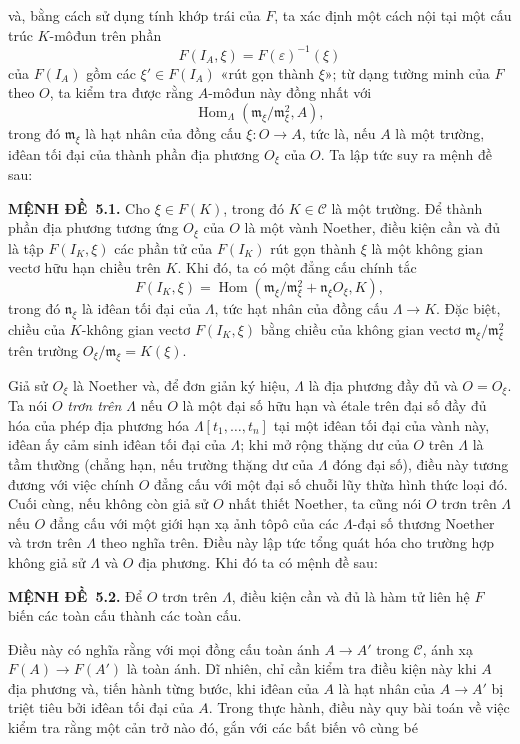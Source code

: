 \documentclass[11pt,twoside,openany]{book}
\numberwithin{equation}{section}
\newcommand{\src}[1]{%
  \phantomsection\hypertarget{src:\fgasourceid:#1}{}%
  \marginpar{\raggedleft\footnotesize\sffamily #1}%
}
\newcommand{\fgasourceid}{unset}
\newcommand{\result}[2]{\par\medskip\noindent\textbf{#1\if\relax\detokenize{#2}\relax\else\ #2\fi.}\quad}
\begin{document}
\src{376}
và, bằng cách sử dụng tính khớp trái của $F$, ta xác định một cách nội tại
một cấu trúc $K$-môđun trên phần
\[
  F(I_A,\xi)=F(\varepsilon)^{-1}(\xi)
\]
của $F(I_A)$ gồm các $\xi'\in F(I_A)$ «rút gọn thành $\xi$»; từ dạng tường
minh của $F$ theo $O$, ta kiểm tra được rằng $A$-môđun này đồng nhất với
\[
  \operatorname{Hom}_{\Lambda}(\mathfrak m_\xi/\mathfrak m_\xi^2,A),
\]
trong đó $\mathfrak m_\xi$ là hạt nhân của đồng cấu
$\xi:O\longrightarrow A$, tức là, nếu $A$ là một trường, iđêan tối đại của
thành phần địa phương $O_\xi$ của $O$. Ta lập tức suy ra mệnh đề sau:

\result{MỆNH ĐỀ}{5.1} Cho $\xi\in F(K)$, trong đó $K\in\mathcal C$ là một
trường. Để thành phần địa phương tương ứng $O_\xi$ của $O$ là một vành
Noether, điều kiện cần và đủ là tập $F(I_K,\xi)$ các phần tử của $F(I_K)$ rút
gọn thành $\xi$ là một không gian vectơ hữu hạn chiều trên $K$. Khi đó, ta có
một đẳng cấu chính tắc
\[
  F(I_K,\xi)=
  \operatorname{Hom}\!\left(
    \mathfrak m_\xi/\mathfrak m_\xi^2+\mathfrak n_\xi O_\xi,K
  \right),
\]
trong đó $\mathfrak n_\xi$ là iđêan tối đại của $\Lambda$, tức hạt nhân của
đồng cấu $\Lambda\longrightarrow K$.
Đặc biệt, chiều của $K$-không gian vectơ $F(I_K,\xi)$ bằng chiều của không
gian vectơ $\mathfrak m_\xi/\mathfrak m_\xi^2$ trên trường
$O_\xi/\mathfrak m_\xi=K(\xi)$.

Giả sử $O_\xi$ là Noether và, để đơn giản ký hiệu, $\Lambda$ là địa phương
đầy đủ và $O=O_\xi$. Ta nói $O$ \emph{trơn trên $\Lambda$} nếu $O$ là một
đại số hữu hạn và étale trên đại số đầy đủ hóa của phép địa phương hóa
$\Lambda[t_1,\ldots,t_n]$ tại một iđêan tối đại của vành này, iđêan ấy cảm
sinh iđêan tối đại của $\Lambda$; khi mở rộng thặng dư của $O$ trên
$\Lambda$ là tầm thường (chẳng hạn, nếu trường thặng dư của $\Lambda$ đóng
đại số), điều này tương đương với việc chính $O$ đẳng cấu với một đại số
chuỗi lũy thừa hình thức loại đó.
Cuối cùng, nếu không còn giả sử $O$ nhất thiết Noether, ta cũng nói $O$ trơn
trên $\Lambda$ nếu $O$ đẳng cấu với một giới hạn xạ ảnh tôpô của các
$\Lambda$-đại số thương Noether và trơn trên $\Lambda$ theo nghĩa trên. Điều
này lập tức tổng quát hóa cho trường hợp không giả sử $\Lambda$ và $O$ địa
phương. Khi đó ta có mệnh đề sau:

\result{MỆNH ĐỀ}{5.2} Để $O$ trơn trên $\Lambda$, điều kiện cần và đủ là hàm
tử liên hệ $F$ biến các toàn cấu thành các toàn cấu.

Điều này có nghĩa rằng với mọi đồng cấu toàn ánh
$A\longrightarrow A'$ trong $\mathcal C$, ánh xạ
$F(A)\longrightarrow F(A')$ là toàn ánh. Dĩ nhiên, chỉ cần kiểm tra điều kiện
này khi $A$ địa phương và, tiến hành từng bước, khi iđêan của $A$ là hạt nhân
của $A\longrightarrow A'$ bị triệt tiêu bởi iđêan tối đại của $A$. Trong
thực hành, điều này quy bài toán về việc kiểm tra rằng một cản trở nào đó,
gắn với các bất biến vô cùng bé
\end{document}
